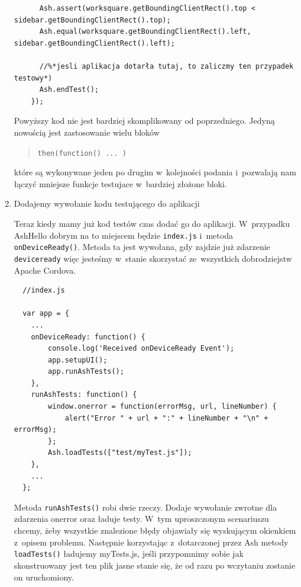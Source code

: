 \documentclass[brudnopis]{xmgr}
\begin{document}
\begin{enumerate}
\begin{lstlisting}
      Ash.assert(worksquare.getBoundingClientRect().top < sidebar.getBoundingClientRect().top);
      Ash.equal(worksquare.getBoundingClientRect().left, sidebar.getBoundingClientRect().left);        

      //%*jesli aplikacja dotarła tutaj, to zaliczmy ten przypadek testowy*)
      Ash.endTest();
    });
\end{lstlisting}

Powyższy kod nie jest bardziej skomplikowany od poprzedniego. Jedyną nowością jest zastosowanie wielu bloków 

\begin{quote}
  \texttt{then(function(){ ... })}
\end{quote}

które są wykonywane jeden po drugim w~kolejności podania i~pozwalają nam łączyć mniejsze funkcje testujace w~bardziej złożone bloki.

 \item Dodajemy wywołanie kodu testującego do aplikacji

Teraz kiedy mamy już kod testów czas dodać go do aplikacji. W~przypadku AshHello dobrym na to miejscem będzie \texttt{index.js} i~metoda \mbox{\texttt{onDeviceReady()}}. Metoda ta jest wywołana, gdy zajdzie już zdarzenie \texttt{deviceready} więc jesteśmy w~stanie skorzystać ze~wszystkich dobrodziejstw Apache Cordova.

 \begin{lstlisting}
  //index.js
  
  var app = {
	...
    onDeviceReady: function() {
        console.log('Received onDeviceReady Event');
        app.setupUI();
        app.runAshTests();
    },
    runAshTests: function() {
        window.onerror = function(errorMsg, url, lineNumber) {
            alert("Error " + url + ":" + lineNumber + "\n" + errorMsg);
        };
        Ash.loadTests(["test/myTest.js"]);
    },
	...
  };

\end{lstlisting}

Metoda \texttt{runAshTests()} robi dwie rzeczy. Dodaje wywołanie zwrotne dla zdarzenia onerror oraz ładuje testy. W~tym uproszczonym scenariuszu chcemy, żeby wszystkie znalezione błędy objawiały się wyskującym okienkiem z~opisem problemu. Następnie korzystając z~dotarczonej przez Ash metody \texttt{loadTests()} ładujemy myTests.js, jeśli przypomnimy sobie jak skonstruowany jest ten plik jasne stanie się, że od razu po wczytaniu zostanie on uruchomiony. 

\end{enumerate}
\end{document}
